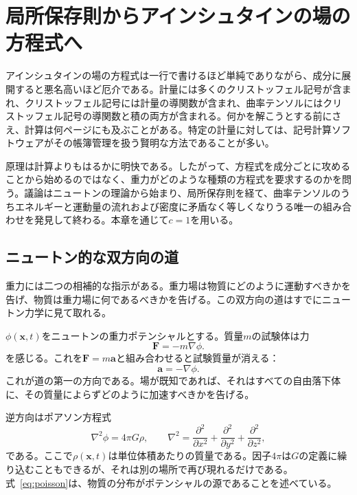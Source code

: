 \chapter{局所保存則からアインシュタインの場の方程式へ}

アインシュタインの場の方程式は一行で書けるほど単純でありながら、成分に展開すると悪名高いほど厄介である。計量には多くのクリストッフェル記号が含まれ、クリストッフェル記号には計量の導関数が含まれ、曲率テンソルにはクリストッフェル記号の導関数と積の両方が含まれる。何かを解こうとする前にさえ、計算は何ページにも及ぶことがある。特定の計量に対しては、記号計算ソフトウェアがその帳簿管理を扱う賢明な方法であることが多い。

原理は計算よりもはるかに明快である。したがって、方程式を成分ごとに攻めることから始めるのではなく、重力がどのような種類の方程式を要求するのかを問う。議論はニュートンの理論から始まり、局所保存則を経て、曲率テンソルのうちエネルギーと運動量の流れおよび密度に矛盾なく等しくなりうる唯一の組み合わせを発見して終わる。本章を通じて\(c=1\)を用いる。

\section{ニュートン的な双方向の道}

重力には二つの相補的な指示がある。重力場は物質にどのように運動すべきかを告げ、物質は重力場に何であるべきかを告げる。この双方向の道はすでにニュートン力学に見て取れる。

\(\phi(\mathbf{x},t)\)をニュートンの重力ポテンシャルとする。質量\(m\)の試験体は力
\begin{equation}
 \mathbf{F}=-m\nabla\phi.
\end{equation}
を感じる。これを\(\mathbf{F}=m\mathbf{a}\)と組み合わせると試験質量が消える：
\begin{equation}
 \mathbf{a}=-\nabla\phi.
\end{equation}
これが道の第一の方向である。場が既知であれば、それはすべての自由落下体に、その質量によらずどのように加速すべきかを告げる。

逆方向はポアソン方程式
\begin{equation}
 \nabla^2\phi=4\pi G\rho,
 \qquad
 \nabla^2=
 \frac{\partial^2}{\partial x^2}
 +\frac{\partial^2}{\partial y^2}
 +\frac{\partial^2}{\partial z^2},
 \label{eq:poisson}
\end{equation}
である。ここで\(\rho(\mathbf{x},t)\)は単位体積あたりの質量である。因子\(4\pi\)は\(G\)の定義に繰り込むこともできるが、それは別の場所で再び現れるだけである。式~\eqref{eq:poisson}は、物質の分布がポテンシャルの源であることを述べている。

